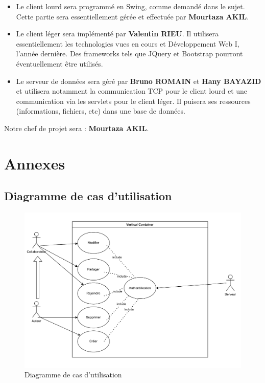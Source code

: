 	\begin{itemize}

		\item Le client lourd sera programmé en Swing, comme demandé dans le sujet. Cette partie sera essentiellement gérée et effectuée par \textbf{Mourtaza AKIL}.
		
		\item Le client léger sera implémenté par \textbf{Valentin RIEU}. Il utilisera essentiellement les technologies vues en cours et Développement Web I, l'année dernière. Des frameworks tels que JQuery et Bootstrap pourront éventuellement être utilisés.
		
		\item Le serveur de données sera géré par \textbf{Bruno ROMAIN} et \textbf{Hany BAYAZID} et utilisera notamment la communication TCP pour le client lourd et une communication via les servlets pour le client léger. Il puisera ses ressources (informations, fichiers, etc) dans une base de données.
	
	\end{itemize}
	
	Notre chef de projet sera : \textbf{Mourtaza AKIL}.
	
	\section{Annexes}
	\appendix
	
	\subsection{Diagramme de cas d'utilisation}

	\begin{figure}[hb]
		\centering

		\includegraphics[scale=.3]{setup/diagramme_de_cas.png}
	\caption{Diagramme de cas d'utilisation}	
	\end{figure}
	\newpage
	
